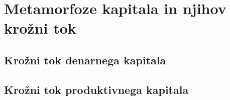 \documentclass[egregdoesnotlikesansseriftitles, a5paper, BCOR=1cm, DIV=calc]{scrbook}
\begin{document}
% 

\part{Metamorfoze kapitala in njihov krožni tok}

    \chapter{Krožni tok denarnega kapitala}
    

    \chapter{Krožni tok produktivnega kapitala}
    








\end{document}
